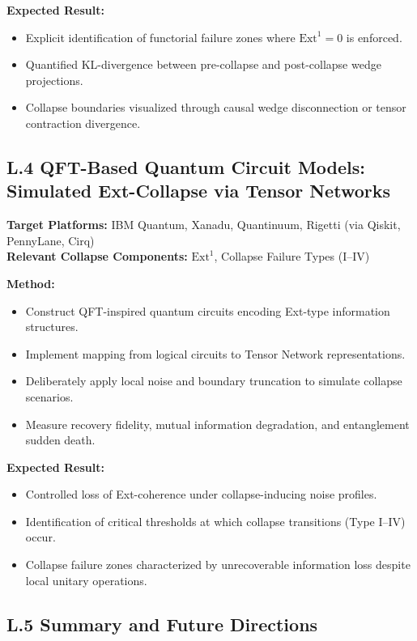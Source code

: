 \documentclass[11pt]{article}
\begin{document}
\textbf{Expected Result:}
\begin{itemize}
    \item Explicit identification of functorial failure zones where \( \mathrm{Ext}^1 = 0 \) is enforced.
    \item Quantified KL-divergence between pre-collapse and post-collapse wedge projections.
    \item Collapse boundaries visualized through causal wedge disconnection or tensor contraction divergence.
\end{itemize}

\subsection*{L.4 QFT-Based Quantum Circuit Models: Simulated Ext-Collapse via Tensor Networks}

\textbf{Target Platforms:} IBM Quantum, Xanadu, Quantinuum, Rigetti (via Qiskit, PennyLane, Cirq) \\
\textbf{Relevant Collapse Components:} \( \mathrm{Ext}^1 \), Collapse Failure Types (I–IV)

\textbf{Method:}
\begin{itemize}
    \item Construct QFT-inspired quantum circuits encoding Ext-type information structures.
    \item Implement mapping from logical circuits to Tensor Network representations.
    \item Deliberately apply local noise and boundary truncation to simulate collapse scenarios.
    \item Measure recovery fidelity, mutual information degradation, and entanglement sudden death.
\end{itemize}

\textbf{Expected Result:}
\begin{itemize}
    \item Controlled loss of Ext-coherence under collapse-inducing noise profiles.
    \item Identification of critical thresholds at which collapse transitions (Type I–IV) occur.
    \item Collapse failure zones characterized by unrecoverable information loss despite local unitary operations.
\end{itemize}

\subsection*{L.5 Summary and Future Directions}
\end{document}
